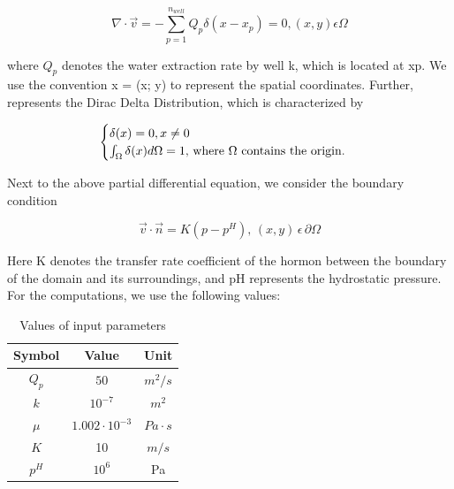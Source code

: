\documentclass{report}
\begin{document}
\begin{equation}
	\nabla\cdot\vec{v}=-\sum_{p=1}^{n_{well}}Q_p\delta(x-x_p)=0,(x,y) \epsilon\Omega 
\end{equation}

where $Q_p$ denotes the water extraction rate by well k, which is located at xp. We use the convention x = (x; y) to represent the spatial coordinates. Further,  represents the Dirac Delta Distribution, which is characterized by

\begin{equation}
	\begin{cases} 
		\delta(x) = 0,x \neq 0 \\ \int_{\Omega}\delta(x)d\Omega = 1,$  where $\Omega $  contains the origin.$
	\end{cases} 
\end{equation}

\medskip
Next to the above partial differential equation, we consider the boundary condition 

\begin{equation}
	\vec{v}\cdot\vec{n}=K(p-p^H), \, (x,y)\, \epsilon\,  \partial\Omega
\end{equation}
\bigskip

Here K denotes the transfer rate coefficient of the hormon between the boundary of the domain and its surroundings, and pH represents the hydrostatic pressure. For the computations, we use the following values:


\begin{table}[ht]
	\caption{Values of input parameters} %
	\centering %
	\begin{tabular}{c c c} %
		\hline\hline %
		Symbol & Value & Unit\\ [0.5ex] %
		\hline %
		$Q_p$ & $50$ & $m^2/s$ \\ %
		$k$ & $10^{-7}$ & $m^2$ \\
		$\mu$ & $1.002\cdot 10^{-3}$ & $Pa\cdot s$ \\
		$K$ & 10 & $m/s$ \\
		$p^H$ & $10^6$ & Pa \\ [1ex] %
		\hline %
	\end{tabular}
	\label{table:nonlin} %
\end{table}
\bigskip
\end{document}

